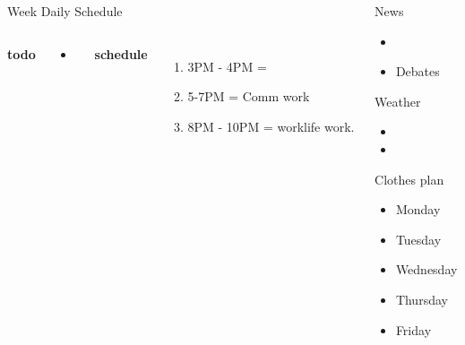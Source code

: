 \begin{frame}
\begin{columns}
\begin{column}{0.50\linewidth}
\begin{block}{Week Daily Schedule}
\begin{columns}
          \textbf{\small todo}\\
          \begin{itemize} 
           \tiny \item \tiny 
          \end{itemize}

          \textbf{\small schedule}\\
          \begin{enumerate} 
            \tiny \item \tiny 3PM - 4PM  =
          \item \tiny 5-7PM = Comm work 
          \item \tiny 8PM - 10PM = worklife work. 
          \end{enumerate} 
        \end{columns}
      \end{block}
    \end{column}%
    
    \begin{column}{0.20\linewidth}
      \begin{block}{News}
        \begin{itemize} 
          \tiny \item \tiny 
        \item \tiny Debates
        \end{itemize}
      \end{block}
      
      \begin{block}{Weather} 
        \begin{itemize}
          \tiny \item \tiny 
        \item \tiny 
        \end{itemize}
      \end{block} 

      \begin{block}{Clothes plan} 
        \begin{itemize}
          \tiny \item \tiny Monday
        \item \tiny Tuesday 
        \item \tiny Wednesday
        \item \tiny Thursday
        \item \tiny Friday
        \end{itemize} 
      \end{block}
      

\end{column}
\end{columns}
\end{frame}
